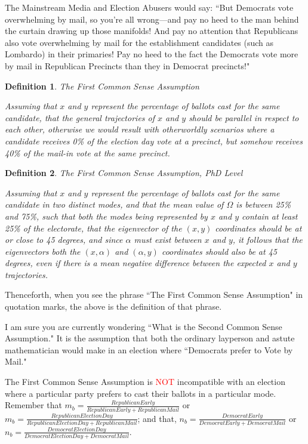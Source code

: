\documentclass[preprint,13pt]{elsarticle}
\newtheorem{definition}{Definition}[section]
\begin{document}
The Mainstream Media and Election Abusers would say: ``But Democrats vote overwhelming by mail, so you're all wrong---and pay no heed to the man behind the curtain drawing up those manifolds! And pay no attention that Republicans also vote overwhelming by mail for the establishment candidates (such as Lombardo) in their primaries! Pay no heed to the fact the Democrats vote more by mail in Republican Precincts than they in Democrat precincts!"
\begin{definition}{The First Common Sense Assumption}

Assuming that $x$ and $y$ represent the percentage of ballots cast for the same candidate, that the general trajectories of $x$ and $y$ should be parallel in respect to each other, otherwise we would result with otherworldly scenarios where a candidate receives 0\% of the election day vote at a precinct, but somehow receives 40\% of the mail-in vote at the same precinct.
\end{definition}

\begin{definition}{The First Common Sense Assumption, PhD Level}

Assuming that $x$ and $y$ represent the percentage of ballots cast for the same candidate in two distinct modes, and that the mean value of $\Omega$ is between 25\% and 75\%, such that both the modes being represented by $x$ and $y$ contain at least 25\% of the electorate, that the eigenvector of the $(x,y)$ coordinates should be at or close to 45 degrees, and since $\alpha$ must exist between $x$ and $y$, it follows that the eigenvectors both the $(x,\alpha)$ and $(\alpha,y)$ coordinates should also be at 45 degrees, even if there is a mean negative difference between the expected $x$ and $y$ trajectories.
\end{definition}

Thenceforth, when you see the phrase ``The First Common Sense Assumption" in quotation marks, the above is the definition of that phrase. 

I am sure you are currently wondering ``What is the Second Common Sense Assumption." It is the assumption that both the ordinary layperson and astute mathematician would make in an election where ``Democrats prefer to Vote by Mail." 

The First Common Sense Assumption is \textcolor{red}{NOT} incompatible with an election where a particular party prefers to cast their ballots in a particular mode. Remember that $m_{b}=\frac{Republican Early}{Republican Early + Republican Mail}$ or $m_{b}=\frac{Republican Election Day}{Republican Election Day + Republican Mail}$; and that, $n_{b}=\frac{Democrat Early}{Democrat Early + Democrat Mail}$ or $n_{b}=\frac{Democrat Election Day}{Democrat Election Day + Democrat Mail}$.
\end{document}
